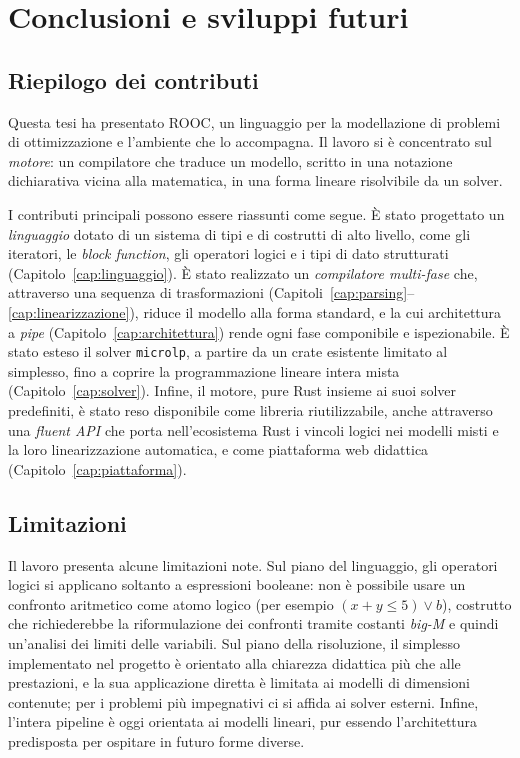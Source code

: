 
\chapter{Conclusioni e sviluppi futuri}
\label{cap:conclusioni}

\section{Riepilogo dei contributi}
\label{sec:riepilogo}

Questa tesi ha presentato ROOC, un linguaggio per la modellazione di problemi di
ottimizzazione e l'ambiente che lo accompagna. Il lavoro si è concentrato sul
\emph{motore}: un compilatore che traduce un modello, scritto in una notazione
dichiarativa vicina alla matematica, in una forma lineare risolvibile da un
solver.

I contributi principali possono essere riassunti come segue. È stato progettato
un \emph{linguaggio} dotato di un sistema di tipi e di costrutti di alto livello,
come gli iteratori, le \emph{block function}, gli operatori logici e i tipi di
dato strutturati (Capitolo~\ref{cap:linguaggio}). È stato realizzato un \emph{compilatore
multi-fase} che, attraverso una sequenza di trasformazioni
(Capitoli~\ref{cap:parsing}--\ref{cap:linearizzazione}), riduce il modello alla
forma standard, e la cui architettura a \emph{pipe}
(Capitolo~\ref{cap:architettura}) rende ogni fase componibile e ispezionabile. È
stato esteso il solver \texttt{microlp}, a partire da un crate esistente
limitato al simplesso, fino a coprire la programmazione lineare intera mista
(Capitolo~\ref{cap:solver}). Infine, il motore, pure Rust insieme ai suoi
solver predefiniti, è stato reso disponibile come libreria riutilizzabile, anche
attraverso una \emph{fluent API} che porta nell'ecosistema Rust i vincoli logici
nei modelli misti e la loro linearizzazione automatica, e come piattaforma web
didattica
(Capitolo~\ref{cap:piattaforma}).

\section{Limitazioni}
\label{sec:limitazioni}

Il lavoro presenta alcune limitazioni note. Sul piano del linguaggio, gli
operatori logici si applicano soltanto a espressioni booleane: non è possibile
usare un confronto aritmetico come atomo logico (per esempio $(x + y \le 5)
\lor b$), costrutto che richiederebbe la riformulazione dei confronti tramite
costanti \emph{big-M} e quindi un'analisi dei limiti delle variabili. Sul piano
della risoluzione, il simplesso implementato nel
progetto è orientato alla chiarezza didattica più che alle prestazioni, e la sua
applicazione diretta è limitata ai modelli di dimensioni contenute; per i
problemi più impegnativi ci si affida ai solver esterni. Infine, l'intera
pipeline è oggi orientata ai modelli lineari, pur essendo l'architettura
predisposta per ospitare in futuro forme diverse.


